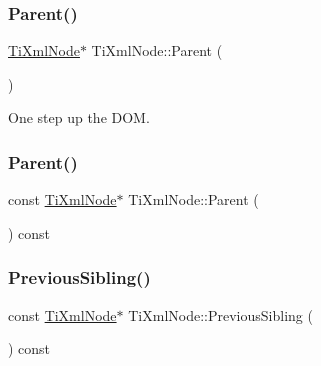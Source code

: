 \subsubsection{\texorpdfstring{Parent()}{Parent()}\hspace{0.1cm}{\footnotesize\ttfamily [1/2]}}
{\footnotesize\ttfamily \hyperlink{class_ti_xml_node}{Ti\+Xml\+Node}$\ast$ Ti\+Xml\+Node\+::\+Parent (\begin{DoxyParamCaption}{ }\end{DoxyParamCaption})\hspace{0.3cm}{\ttfamily [inline]}}



One step up the D\+OM. 

\mbox{\label{class_ti_xml_node_af13df38878a5798142693d01d6133ba0}} 
\subsubsection{\texorpdfstring{Parent()}{Parent()}\hspace{0.1cm}{\footnotesize\ttfamily [2/2]}}
{\footnotesize\ttfamily const \hyperlink{class_ti_xml_node}{Ti\+Xml\+Node}$\ast$ Ti\+Xml\+Node\+::\+Parent (\begin{DoxyParamCaption}{ }\end{DoxyParamCaption}) const\hspace{0.3cm}{\ttfamily [inline]}}

\mbox{\label{class_ti_xml_node_a8aacf06b1a577ff0d7cfa502cc76da32}} 
\subsubsection{\texorpdfstring{Previous\+Sibling()}{PreviousSibling()}\hspace{0.1cm}{\footnotesize\ttfamily [1/4]}}
{\footnotesize\ttfamily const \hyperlink{class_ti_xml_node}{Ti\+Xml\+Node}$\ast$ Ti\+Xml\+Node\+::\+Previous\+Sibling (\begin{DoxyParamCaption}{ }\end{DoxyParamCaption}) const\hspace{0.3cm}{\ttfamily [inline]}}



